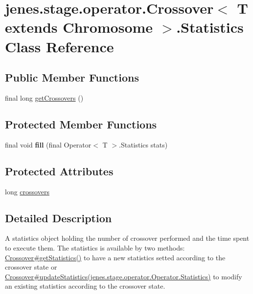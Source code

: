 \hypertarget{classjenes_1_1stage_1_1operator_1_1_crossover_3_01_t_01extends_01_chromosome_01_4_1_1_statistics}{
\section{jenes.stage.operator.Crossover$<$ T extends Chromosome $>$.Statistics Class Reference}
\label{classjenes_1_1stage_1_1operator_1_1_crossover_3_01_t_01extends_01_chromosome_01_4_1_1_statistics}
}
\subsection*{Public Member Functions}
\begin{CompactItemize}
\item 
final long \hyperlink{classjenes_1_1stage_1_1operator_1_1_crossover_3_01_t_01extends_01_chromosome_01_4_1_1_statistics_6181ee46b3e760f5d440e758d95db04b}{getCrossovers} ()
\end{CompactItemize}
\subsection*{Protected Member Functions}
\begin{CompactItemize}
\item 
\hypertarget{classjenes_1_1stage_1_1operator_1_1_crossover_3_01_t_01extends_01_chromosome_01_4_1_1_statistics_e352590e85b1d1d821b0912a770f257a}{
final void \textbf{fill} (final Operator$<$ T $>$.Statistics stats)}
\label{classjenes_1_1stage_1_1operator_1_1_crossover_3_01_t_01extends_01_chromosome_01_4_1_1_statistics_e352590e85b1d1d821b0912a770f257a}

\end{CompactItemize}
\subsection*{Protected Attributes}
\begin{CompactItemize}
\item 
long \hyperlink{classjenes_1_1stage_1_1operator_1_1_crossover_3_01_t_01extends_01_chromosome_01_4_1_1_statistics_bf1983cc628b3283b942dc68cc871bbc}{crossovers}
\end{CompactItemize}


\subsection{Detailed Description}
A statistics object holding the number of crossover performed and the time spent to execute them. The statistics is available by two methods: \hyperlink{}{Crossover\#getStatistics()} to have a new statistics setted according to the crossover state or \hyperlink{}{Crossover\#updateStatistics(jenes.stage.operator.Operator.Statistics)} to modify an existing statistics according to the crossover state. 

